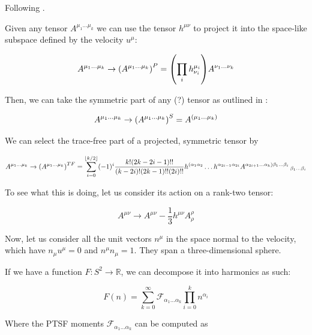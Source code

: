 \documentclass[main.tex]{subfiles}
\begin{document}
Following \cite{Thorne:1981feb}.

Given any tensor \(A^{\mu_1 \dots \mu_k}\) we can use the tensor \(h^{\mu\nu}\) to project it into the space-like subspace defined by the velocity \(u^\mu\):

\begin{equation}
    A^{\mu_1 \dots \mu_k} \rightarrow \qty(A^{\mu_1 \dots \mu_k})^P
    = \qty(\prod_i h^{\mu_i}_{\nu_i}) A^{\nu_1 \dots \nu_k}
\end{equation}

Then, we can take the symmetric part of any (?) tensor as outlined in :

\begin{equation}
    A^{\mu_1 \dots \mu_k} \rightarrow \qty(A^{\mu_1 \dots \mu_k})^S
    = A^{(\mu_1 \dots \mu_k)}
\end{equation}

We can select the trace-free part of a projected, symmetric tensor by

\begin{equation}
    A^{\mu_1 \dots \mu_k} \rightarrow \qty(A^{\mu_1 \dots \mu_k})^{TF}
    = \sum _{i=0}   ^{\lfloor k/2 \rfloor}
    (-1)^i \frac{k! (2k-2i-1)!!}{(k-2i)! (2k-1)!! (2i)!!}
    h^{(\alpha_1 \alpha_2} \dots h^{\alpha_{2i-1} \alpha_{2i}}
    A^{\alpha_{2i+1} \dots \alpha_k) \beta_1 \dots \beta_i}\,_{\beta_1 \dots \beta_i}
\end{equation}

To see what this is doing, let us consider its action on a rank-two tensor:

\begin{equation}
    A^{\mu\nu} \rightarrow A^{\mu\nu} - \frac{1}{3} h^{\mu\nu} A^{\rho}_\rho
\end{equation}

Now, let us consider all the unit vectors \(n^\mu\) in the space normal to the velocity, which have \(n_\mu u^\mu = 0\) and \(n^\mu n_\mu = 1\). They span a three-dimensional sphere.

If we have a function \(F\colon S^2 \rightarrow \mathbb R\), we can decompose it into harmonics as such:

\begin{equation}
    F(n) = \sum _{k=0}   ^{\infty}
    \mathscr F_{\alpha_1 \dots \alpha_k} \prod_{i=0}^k n^{\alpha_i}
\end{equation}

Where the PTSF moments \(\mathscr F_{\alpha_1 \dots \alpha_k}\) can be computed as
\end{document}
